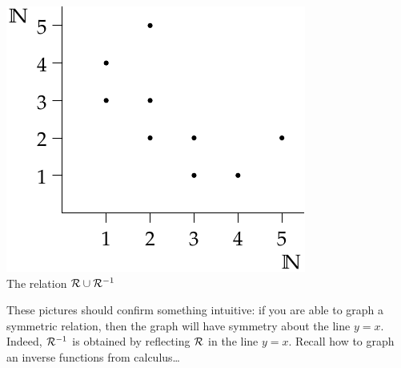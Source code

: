 \begin{center}
\begin{minipage}{0.35\textwidth}
		\includegraphics[width=\textwidth]{relations-04-relnun}\\
		The relation $\mathcal{R}\cup \mathcal{R}^{-1}$
	\end{minipage}
\end{center}

These pictures should confirm something intuitive: if you are able to graph a symmetric relation, then the graph will have symmetry about the line $y=x$. Indeed, $\mathcal{R}^{-1}$ is obtained by reflecting $\mathcal{R}$ in the line $y=x$. Recall how to graph an inverse functions from calculus\ldots

% 

